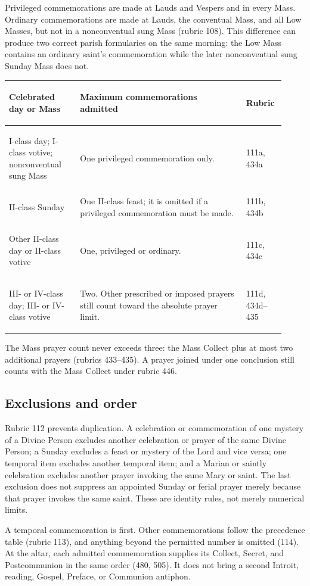 Privileged commemorations are made at Lauds and Vespers and in every Mass. Ordinary commemorations are made at Lauds, the conventual Mass, and all Low Masses, but not in a nonconventual sung Mass (rubric 108). This difference can produce two correct parish formularies on the same morning: the Low Mass contains an ordinary saint's commemoration while the later nonconventual sung Sunday Mass does not.

\begin{longtable}{>{\bfseries\raggedright\arraybackslash}p{0.24\linewidth}>{\raggedright\arraybackslash}p{0.56\linewidth}>{\raggedright\arraybackslash}p{0.12\linewidth}}
\toprule
Celebrated day or Mass & Maximum commemorations admitted & Rubric\\
\midrule
\endhead
I-class day; I-class votive; nonconventual sung Mass & One privileged commemoration only. & 111a, 434a\\
II-class Sunday & One II-class feast; it is omitted if a privileged commemoration must be made. & 111b, 434b\\
Other II-class day or II-class votive & One, privileged or ordinary. & 111c, 434c\\
III- or IV-class day; III- or IV-class votive & Two. Other prescribed or imposed prayers still count toward the absolute prayer limit. & 111d, 434d--435\\
\bottomrule
\end{longtable}

The Mass prayer count never exceeds three: the Mass Collect plus at most two additional prayers (rubrics 433--435). A prayer joined under one conclusion still counts with the Mass Collect under rubric 446.

\subsection{Exclusions and order}

Rubric 112 prevents duplication. A celebration or commemoration of one mystery of a Divine Person excludes another celebration or prayer of the same Divine Person; a Sunday excludes a feast or mystery of the Lord and vice versa; one temporal item excludes another temporal item; and a Marian or saintly celebration excludes another prayer invoking the same Mary or saint. The last exclusion does not suppress an appointed Sunday or ferial prayer merely because that prayer invokes the same saint. These are identity rules, not merely numerical limits.

A temporal commemoration is first. Other commemorations follow the precedence table (rubric 113), and anything beyond the permitted number is omitted (114). At the altar, each admitted commemoration supplies its Collect, Secret, and Postcommunion in the same order (480, 505). It does not bring a second Introit, reading, Gospel, Preface, or Communion antiphon.

